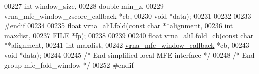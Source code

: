 \begin{DoxyCode}
00227                \textcolor{keywordtype}{int}                              window\_size,
00228                \textcolor{keywordtype}{double}                           min\_z,
00229                vrna\_mfe\_window\_zscore\_callback  *cb,
00230                \textcolor{keywordtype}{void}                             *data);
00231 
00232 
00233 \textcolor{preprocessor}{#endif}
00234 
00235 \textcolor{keywordtype}{float} vrna\_aliLfold(\textcolor{keyword}{const} \textcolor{keywordtype}{char}  **alignment,
00236                     \textcolor{keywordtype}{int}         maxdist,
00237                     FILE        *fp);
00238 
00239 
00240 \textcolor{keywordtype}{float} vrna\_aliLfold\_cb(\textcolor{keyword}{const} \textcolor{keywordtype}{char}               **alignment,
00241                        \textcolor{keywordtype}{int}                      maxdist,
00242                        \hyperlink{group__mfe__window_ga4f3e5bc214ef803074ace313cb9571b4}{vrna\_mfe\_window\_callback} *cb,
00243                        \textcolor{keywordtype}{void}                     *data);
00244 
00245 \textcolor{comment}{/* End simplified local MFE interface */}
00248 \textcolor{comment}{/* End group mfe\_fold\_window */}
00252 \textcolor{preprocessor}{#endif}
\end{DoxyCode}
